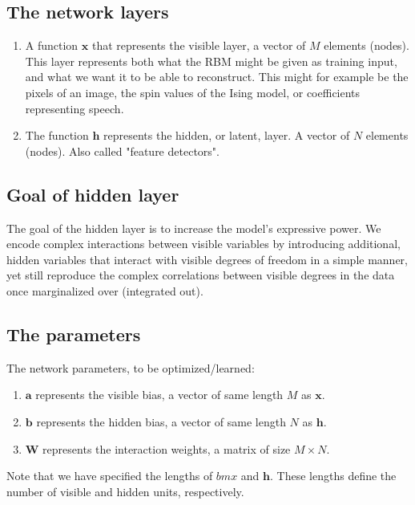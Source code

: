 \documentclass[%
oneside,                 %
final,                   %
10pt]{article}
\begin{document}
\subsection{The network layers}

\begin{enumerate}
\item A function $\bm{x}$ that represents the visible layer, a vector of $M$ elements (nodes). This layer represents both what the RBM might be given as training input, and what we want it to be able to reconstruct. This might for example be the pixels of an image, the spin values of the Ising model, or coefficients representing speech.

\item The function $\bm{h}$ represents the hidden, or latent, layer. A vector of $N$ elements (nodes). Also called "feature detectors".
\end{enumerate}

\noindent
\subsection{Goal of hidden layer}

The goal of the hidden layer is to increase the model's expressive
power. We encode complex interactions between visible variables by
introducing additional, hidden variables that interact with visible
degrees of freedom in a simple manner, yet still reproduce the complex
correlations between visible degrees in the data once marginalized
over (integrated out).

\subsection{The parameters}

The network parameters, to be optimized/learned:
\begin{enumerate}
\item $\bm{a}$ represents the visible bias, a vector of same length $M$ as $\bm{x}$.

\item $\bm{b}$ represents the hidden bias, a vector of same length $N$  as $\bm{h}$.

\item $\bm{W}$ represents the interaction weights, a matrix of size $M\times N$.
\end{enumerate}

\noindent
Note that we have specified the lengths of $bm{x}$ and $\bm{h}$. These
lengths define the number of visible and hidden units, respectively.
\end{document}
